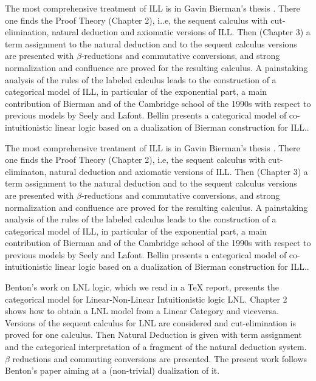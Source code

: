 The most comprehensive treatment of ILL is in Gavin Bierman's thesis
\cite{Bierman:1994}.  There one finds the Proof Theory (Chapter 2),
i..e, the sequent calculus with cut-elimination, natural deduction and
axiomatic versions of ILL. Then (Chapter 3) a term assignment to the
natural deduction and to the sequent calculus versions are presented
with $\beta$-reductions and commutative conversions, and strong
normalization and confluence are proved for the resulting calculus. A
painstaking analysis of the rules of the labeled calculus leads to
the construction of a categorical model of ILL, in particular of the
exponential part, a main contribution of Bierman and of the Cambridge
school of the 1990s with respect to previous models by Seely and
Lafont.  Bellin \cite{Bellin:2014} presents a categorical model of
co-intuitionistic linear logic based on a dualization of Bierman
\cite{Bierman:1994} construction for ILL..

The most comprehensive treatment of ILL is in Gavin Bierman's thesis  \cite{Bierman:1994}.
There one finds the Proof Theory (Chapter 2), i.e, the sequent calculus with cut-eliminaton, natural deduction and
axiomatic versions of ILL. Then (Chapter 3) a term assignment to the natural deduction and to the sequent calculus
versions are presented with $\beta$-reductions and commutative conversions, and strong normalization and confluence
are proved for the resulting calculus. A painstaking analysis of the rules of the labeled calculus leads to the construction
of a categorical model of ILL, in particular of the exponential part, a main contribution of Bierman and of the
Cambridge school of the 1990s with respect to previous models by Seely and Lafont.
Bellin \cite{Bellin:2012} presents a categorical model of co-intuitionistic linear logic based on a dualization of
Bierman \cite{Bierman:1994} construction for ILL..

Benton's work \cite{Benton:1994} on LNL logic, which we read in a TeX report, presents the categorical model 
for Linear-Non-Linear Intuitionistic logic LNL. Chapter 2 shows
how to obtain a LNL model from a Linear Category and viceversa. Versions of the sequent calculus for LNL
are considered  and cut-elimination is proved for one calculus. Then Natural Deduction is given with term
assignment and the categorical interpretation of a fragment of the natural deduction system. $\beta$ reductions
and commuting conversions are presented.
The present work follows Benton's paper aiming at a (non-trivial) dualization of it.

